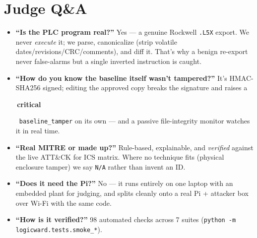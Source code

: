 \documentclass[11pt,a4paper]{article}
\newcommand{\code}[1]{\texttt{\small #1}}
\newcommand{\sev}[2]{\colorbox{#1}{\small\strut\,#2\,}}
\newcommand{\crit}{\sev{critbg}{\color{critical}\textbf{critical}}}
\begin{document}
\section{Judge Q\&A}
\begin{itemize}[leftmargin=1.3em,itemsep=3pt]
  \item \textbf{``Is the PLC program real?''} Yes --- a genuine Rockwell \code{.L5X} export.
        We never \emph{execute} it; we parse, canonicalize (strip volatile
        dates/revisions/CRC/comments), and diff it. That's why a benign re-export never
        false-alarms but a single inverted instruction is caught.
  \item \textbf{``How do you know the baseline itself wasn't tampered?''} It's HMAC-SHA256
        signed; editing the approved copy breaks the signature and raises a \crit\
        \code{baseline\_tamper} on its own --- and a passive file-integrity monitor watches
        it in real time.
  \item \textbf{``Real MITRE or made up?''} Rule-based, explainable, and \emph{verified}
        against the live ATT\&CK for ICS matrix. Where no technique fits (physical enclosure
        tamper) we say \code{N/A} rather than invent an ID.
  \item \textbf{``Does it need the Pi?''} No --- it runs entirely on one laptop with an
        embedded plant for judging, and splits cleanly onto a real Pi + attacker box over
        Wi-Fi with the same code.
  \item \textbf{``How is it verified?''} 98 automated checks across 7 suites
        (\code{python -m logicward.tests.smoke\_*}).
\end{itemize}
\end{document}
